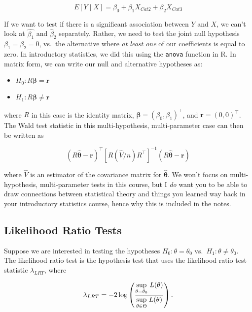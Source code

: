 \documentclass[
  letterpaper,
  DIV=11,
  numbers=noendperiod]{scrreprt}
\begin{document}
\[
E[Y \mid X] = \beta_0 + \beta_1 X_{Cat2} + \beta_2 X_{Cat3}
\]

If we want to test if there is a significant association between \(Y\)
and \(X\), we can't look at \(\hat{\beta_1}\) and \(\hat{\beta}_2\)
separately. Rather, we need to test the joint null hypothesis
\(\beta_1 = \beta_2 = 0\), vs.~the alternative where \emph{at least one}
of our coefficients is equal to zero. In introductory statistics, we did
this using the \texttt{anova} function in R. In matrix form, we can
write our null and alternative hypotheses as:

\begin{itemize}
\item
  \(H_0: R \boldsymbol{\beta} = \textbf{r}\)
\item
  \(H_1: R \boldsymbol{\beta} \neq \textbf{r}\)
\end{itemize}

where \(R\) in this case is the identity matrix,
\(\boldsymbol{\beta} = (\beta_0, \beta_1)^\top\), and
\(\textbf{r} = (0,0)^\top\). The Wald test statistic in this
multi-hypothesis, multi-parameter case can then be written as

\[
(R\hat{\boldsymbol{\theta}} - \textbf{r})^\top [R (\hat{V}/n) R^\top]^{-1} (R\hat{\boldsymbol{\theta}} - \textbf{r})
\]

where \(\hat{V}\) is an estimator of the covariance matrix for
\(\hat{\boldsymbol{\theta}}\). We won't focus on multi-hypothesis,
multi-parameter tests in this course, but I \emph{do} want you to be
able to draw connections between statistical theory and things you
learned way back in your introductory statistics course, hence why this
is included in the notes.

\hypertarget{likelihood-ratio-tests}{%
\subsection*{Likelihood Ratio Tests}\label{likelihood-ratio-tests}}

Suppose we are interested in testing the hypotheses
\(H_0: \theta = \theta_0\) vs.~\(H_1: \theta \neq \theta_0\). The
likelihood ratio test is the hypothesis test that uses the likelihood
ratio test statistic \(\lambda_{LRT}\), where

\[
\lambda_{LRT} = -2 \log\left(\frac{\underset{\theta = \theta_0}{\text{sup}} \hspace{1mm} L(\theta)}{\underset{\theta \in \Theta}{\text{sup}} \hspace{1mm} L(\theta)} \right).
\]
\end{document}
